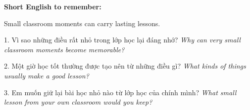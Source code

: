 \begin{ghinhoanh}
\textbf{Short English to remember:}

Small classroom moments can carry lasting lessons.

\end{ghinhoanh}

\begin{tuhocnhanh}
1. Vì sao những điều rất nhỏ trong lớp học lại đáng nhớ? \textit{Why can very small classroom moments become memorable?}

2. Một giờ học tốt thường được tạo nên từ những điều gì? \textit{What kinds of things usually make a good lesson?}

3. Em muốn giữ lại bài học nhỏ nào từ lớp học của chính mình? \textit{What small lesson from your own classroom would you keep?}
\end{tuhocnhanh}

\ngancach